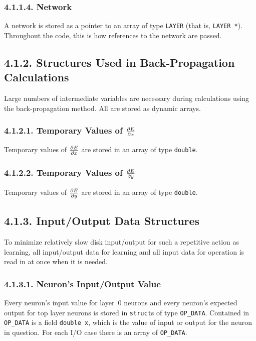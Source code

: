 \documentclass[12pt]{report}
\begin{document}
\subsubsection{4.1.1.4. Network}

A network is stored as a pointer to an array of type \texttt{LAYER} (that
is, \texttt{LAYER *}).
Throughout the code, this is how references to the network are
passed.

\subsection{4.1.2. Structures Used in Back-Propagation Calculations}

Large numbers of intermediate variables are necessary during
calculations using the back-propagation method.
All are stored as dynamic arrays.

\subsubsection{4.1.2.1. Temporary Values of $\partial E \over \partial x$}

Temporary values of $\partial E \over \partial x$ are stored in an
array of type \texttt{double}.

\subsubsection{4.1.2.2. Temporary Values of $\partial E \over \partial y$}

Temporary values of $\partial E \over \partial y$ are stored in an
array of type \texttt{double}.

\subsection{4.1.3. Input/Output Data Structures}

To minimize relatively slow disk input/output for such a repetitive
action as learning, all input/output data for learning and all input
data for operation is read in at once when it is needed.

\subsubsection{4.1.3.1. Neuron's Input/Output Value}

Every neuron's input value for layer~$0$ neurons and every neuron's
expected
output for top layer neurons is stored in \texttt{struct}s of type \texttt{OP\_DATA}.
Contained in \texttt{OP\_DATA} is a field \texttt{double x}, which is the
value of input or output for the neuron in question.
For each I/O case there is an array of \texttt{OP\_DATA}.
\end{document}
